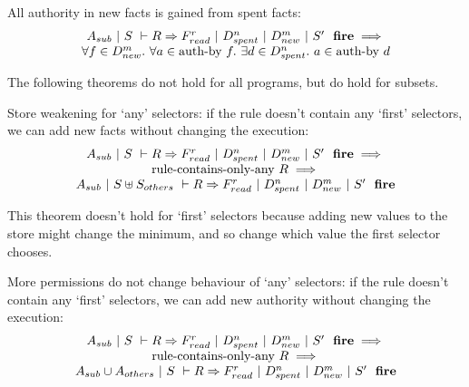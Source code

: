 \begin{theorem}
All authority in new facts is gained from spent facts:
$$
\begin{array}{c}
A_{sub}~|~S~\vdash R \Rightarrow F_{read}^r~|~D_{spent}^n~|~D_{new}^m~|~S'~~\textbf{fire}
\implies \\
\forall f \in D_{new}^m.\ \forall a \in \textrm{auth-by}~f.\ \exists d \in D_{spent}^n.\ a \in \textrm{auth-by}~d
\end{array}
$$
\end{theorem}

The following theorems do not hold for all programs, but do hold for subsets.

\begin{theorem}
Store weakening for `any' selectors: if the rule doesn't contain any `first' selectors, we can add new facts without changing the execution:
$$
\begin{array}{c}
A_{sub}~|~S~\vdash R \Rightarrow F_{read}^r~|~D_{spent}^n~|~D_{new}^m~|~S'~~\textbf{fire}
\implies \\
\textrm{rule-contains-only-any}~R \implies \\
A_{sub}~|~S \uplus S_{others}~\vdash R \Rightarrow F_{read}^r~|~D_{spent}^n~|~D_{new}^m~|~S'~~\textbf{fire}
\end{array}
$$
\end{theorem}

This theorem doesn't hold for `first' selectors because adding new values to the store might change the minimum, and so change which value the first selector chooses.

\begin{theorem}
More permissions do not change behaviour of `any' selectors: if the rule doesn't contain any `first' selectors, we can add new authority without changing the execution:
$$
\begin{array}{c}
A_{sub}~|~S~\vdash R \Rightarrow F_{read}^r~|~D_{spent}^n~|~D_{new}^m~|~S'~~\textbf{fire}
\implies \\
\textrm{rule-contains-only-any}~R \implies \\
A_{sub} \cup A_{others}~|~S~\vdash R \Rightarrow F_{read}^r~|~D_{spent}^n~|~D_{new}^m~|~S'~~\textbf{fire}
\end{array}
$$
\end{theorem}


